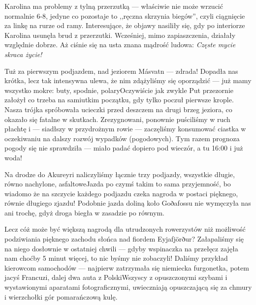 
Karolina ma problemy z tylną przerzutką --- właściwie nie może wrzucić normalnie 6-8, jedyne co pozostaje to ,,ręczna skrzynia biegów'', czyli ciągnięcie za linkę na rurze od ramy. Interesujące, że objawy nasiliły się, gdy po interiorze Karolina usunęła brud z przerzutki. Wcześniej, mimo zapiaszczenia, działały względnie dobrze. Aż ciśnie się na usta znana mądrość ludowa: \emph{Częste mycie skraca życie!}

Tuż za pierwszym podjazdem, nad jeziorem Másvatn --- zdrada! Dopadła nas krótka, lecz tak intensywna ulewa, że nim zdążyliśmy się oporządzić --- już mamy wszystko mokre: buty, spodnie, polary\textellipsis Oczywiście jak zwykle Put przezornie założył co trzeba na samiutkim początku, gdy tylko poczuł pierwsze krople. Nasza trójka spróbowała ucieczki przed deszczem na drugi brzeg jeziora, co okazało się  fatalne w skutkach. Zrezygnowani, ponownie puściliśmy w ruch płachtę i --- siadłszy w przydrożnym rowie --- zaczęliśmy konsumować ciastka w oczekiwaniu na dalszy rozwój wypadków (pogodowych). Tym razem prognoza pogody się nie sprawdziła --- miało padać dopiero pod wieczór, a tu 16:00 i już woda!

Na drodze do Akureyri naliczyliśmy łącznie trzy podjazdy, wszystkie długie, równo nachylone, asfaltowe\textellipsis Jazda po czymś takim to sama przyjemność, bo wiadomo że na szczycie każdego podjazdu czeka nagroda w postaci pięknego, równie długiego zjazdu! Podobnie jazda doliną koło Goðafossu nie wymęczyła nas ani trochę, gdyż droga biegła w zasadzie po równym.

Lecz cóż może być większą nagrodą dla utrudzonych rowerzystów niż możliwość podziwiania pięknego zachodu słońca nad fiordem Eyjafjörður? Załapaliśmy się na niego dosłownie w ostatniej chwili --- gdyby wspinaczka na przełęcz zajęła nam choćby 5 minut więcej, to nic byśmy nie zobaczyli! Daliśmy przykład kierowcom samochodów --- najpierw zatrzymała się niemiecka furgonetka, potem jacyś Francuzi, dalej dwa auta z Polski\textellipsis Wszyscy z opuszczonymi szybami i wystawionymi aparatami fotograficznymi, uwieczniają opuszczającą się za chmury i wierzchołki gór pomarańczową kulę.



